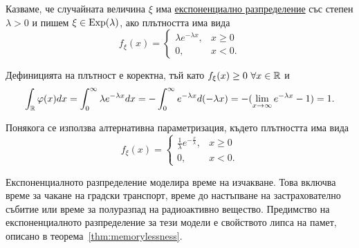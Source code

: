 \documentclass[numbers=endperiod, DIV=15, bibliography=totocnumbered]{scrartcl}
\begin{document}
\begin{definition}
  Казваме, че случайната величина $\xi$ има \uline{експоненциално разпределение} със степен $\lambda > 0$ и пишем $\xi \in \operatorname{Exp}(\lambda)$, ако плътността има вида
  \begin{displaymath}
    f_\xi(x) = \begin{cases}
      \lambda e^{-\lambda x}, & x \geq 0 \\
      0, &x < 0.
    \end{cases}
  \end{displaymath}

  Дефиницията на плътност е коректна, тъй като $f_\xi(x) \geq 0~\forall x \in \mathbb{R}$ и
  \begin{displaymath}
    \int_{\mathbb{R}} \varphi(x) dx
    =
    \int_0^\infty \lambda e^{-\lambda x} dx
    =
    -\int_0^\infty e^{-\lambda x} d(-\lambda x)
    =
    -(\lim_{x \to \infty} e^{-\lambda x} - 1)
    =
    1.
  \end{displaymath}

  Понякога се използва алтернативна параметризация, където плътността има вида
  \begin{displaymath}
    f_\xi(x) = \begin{cases}
      \frac 1 \lambda e^{-\frac x \lambda}, & x \geq 0 \\
      0, &x < 0.
    \end{cases}
  \end{displaymath}
\end{definition}

Експоненциалното разпределение моделира време на изчакване. Това включва време за чакане на градски транспорт, време до настъпване на застрахователно събитие или време за полуразпад на радиоактивно вещество. Предимство на експоненциалното разпределение за тези модели е свойството липса на памет, описано в теорема~\ref{thm:memorylessness}.
\end{document}
